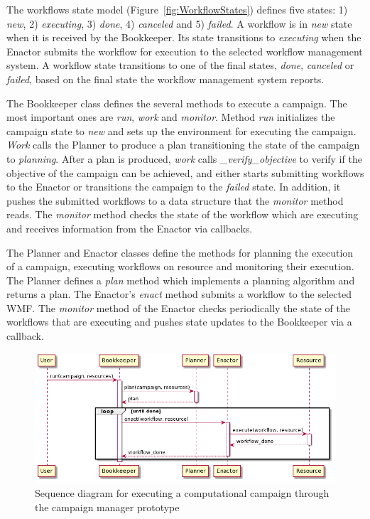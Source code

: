 The workflows state model  (Figure~\ref{fig:WorkflowStates}) defines five 
states: 1) \textit{new}, 2) \textit{executing}, 3) \textit{done}, 
4) \textit{canceled} and 5) \textit{failed}. A workflow is in \textit{new} 
state when it is received by the Bookkeeper. Its state transitions to 
\textit{executing} when the Enactor submits the workflow for execution to the 
selected workflow management system. A workflow state transitions to one of 
the final states,  \textit{done}, \textit{canceled} or \textit{failed}, based 
on the final state the workflow management system reports.

The Bookkeeper class defines the several methods to execute a campaign. The 
most important ones are \textit{run}, \textit{work} and \textit{monitor}.
Method \textit{run} initializes the campaign state to \textit{new} and sets up 
the environment for executing the campaign. \textit{Work} calls the Planner to 
produce a plan transitioning the state of the campaign to \textit{planning}.
After a plan is produced, \textit{work} calls \textit{\_verify\_objective} to 
verify if the objective of the campaign can be achieved, and either starts 
submitting workflows to the Enactor or transitions the campaign to the 
\textit{failed} state. In addition, it pushes the submitted workflows to a 
data structure that the \textit{monitor} method reads. The \textit{monitor} 
method checks the state of the workflow which are executing and receives 
information from the Enactor via callbacks.

The Planner and Enactor classes define the methods for planning the execution 
of a campaign, executing workflows on resource and monitoring their execution.
The Planner defines a \textit{plan} method which implements a planning 
algorithm and returns a plan. The Enactor's \textit{enact} method submits a 
workflow to the selected WMF. The \textit{monitor} method of the Enactor 
checks periodically the state of the workflows that are executing and pushes 
state updates to the Bookkeeper via a callback.

\begin{figure}[t]
    \centering
    \includegraphics[width=.85\textwidth]{figures/manager/rcm_seq.png}
    \caption{Sequence diagram for executing a computational campaign through the campaign manager prototype}
    \label{fig:seq_diag}
\end{figure}

